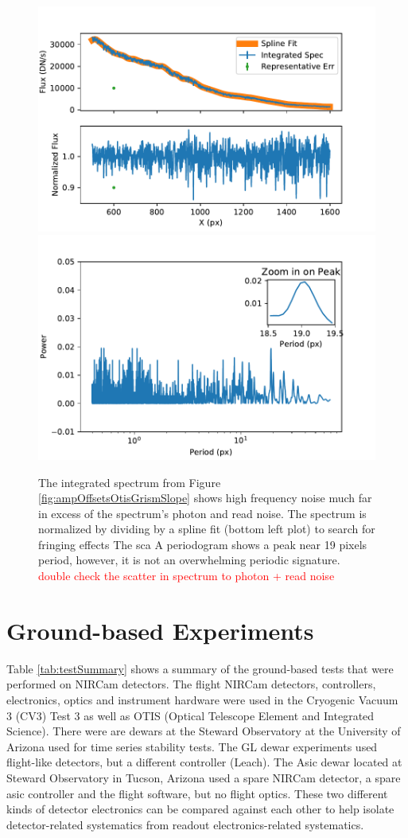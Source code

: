 \documentclass{aastex62}
\begin{document}
\begin{figure}[!hbtp]
\centering
\includegraphics[width=.49\columnwidth]{otis_spec_and_norm.pdf}
\includegraphics[width=.49\columnwidth]{otis_spec_periodogram.pdf}
\caption{The integrated spectrum from Figure \ref{fig:ampOffsetsOtisGrismSlope} shows high frequency noise much far in excess of the spectrum's photon and read noise.
The spectrum is normalized by dividing by a spline fit (bottom left plot) to search for fringing effects
The sca
A periodogram shows a peak near 19 pixels period, however, it is not an overwhelming periodic signature.
\textcolor{red}{double check the scatter in spectrum to photon + read noise}
}\label{fig:integratedOtisGrismSpec}
\end{figure}

\section{Ground-based Experiments}\label{sec:experiments}

Table \ref{tab:testSummary} shows a summary of the ground-based tests that were performed on NIRCam detectors.
The flight NIRCam detectors, controllers, electronics, optics and instrument hardware were used in the Cryogenic Vacuum 3 (CV3) Test 3 as well as OTIS (Optical Telescope Element and Integrated Science).
There were are dewars at the Steward Observatory at the University of Arizona used for time series stability tests.
The GL dewar experiments used flight-like detectors, but a different controller (Leach).
The Asic dewar located at Steward Observatory in Tucson, Arizona used a spare NIRCam detector, a spare asic controller and the flight software, but no flight optics.
These two different kinds of detector electronics can be compared against each other to help isolate detector-related systematics from readout electronics-related systematics.
\end{document}
